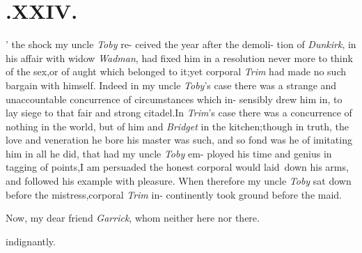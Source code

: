 \documentclass{article}
\begin{document}
\section{.\quad  XXIV.}

’ the shock my uncle \textit{Toby} re-\break
ceived the year after the demoli-\break
tion of \textit{Dunkirk}, in his affair with widow \textit{Wadman}, had fixed
him in a resolution never more to think of the sex,\tsk or of
aught which belonged to it;\tsk yet corporal \textit{Trim} had made
no such bargain with himself. Indeed in my uncle
\textit{Toby}’s case there was a strange and unaccountable
concurrence of circumstances which in- 
sensibly drew him in, to lay siege to that\break
fair and strong citadel.\tsh In \textit{Trim}’s case\break
there was a concurrence of nothing in the\break
world, but of him and \textit{Bridget} in the\break
kitchen;\tsk though in truth, the love and\break
veneration he bore his master was such,\break
and so fond was he of imitating him in\break
all he did, that had my uncle \textit{Toby} em-\break
ployed his time and genius in tagging of\break
points,\tsh I am persuaded the honest\break
corporal would laid\sic\ down his arms, and\break
followed his example with pleasure.\break
When therefore my uncle \textit{Toby} sat down\break
before the mistress,\tsk corporal \textit{Trim} in-\break
continently took ground before the maid.

Now, my dear friend \textit{Garrick}, whom 
neither here nor there.

indignantly.
\end{document}
